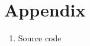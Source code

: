 \documentclass[Main]{subfiles}
\begin{document}
\chapter{Appendix}


\begin{enumerate}
\item Source code \label{App:SourceCode}
\end{enumerate}
\end{document}
